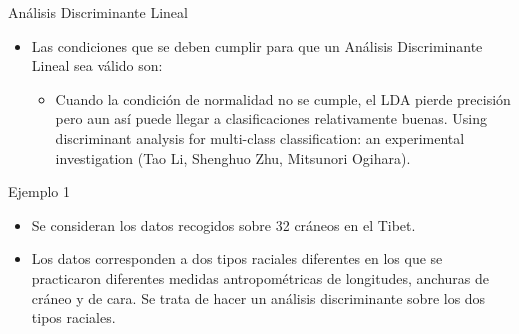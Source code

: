 \documentclass[ignorenonframetext,]{beamer}
\providecommand{\tightlist}{%
  \setlength{\itemsep}{0pt}\setlength{\parskip}{0pt}}
\begin{document}
\begin{frame}{Análisis Discriminante Lineal}

\begin{itemize}
\item
  Las condiciones que se deben cumplir para que un Análisis
  Discriminante Lineal sea válido son:

  \begin{itemize}
  \tightlist
  \item
    Cuando la condición de normalidad no se cumple, el LDA pierde
    precisión pero aun así puede llegar a clasificaciones relativamente
    buenas. Using discriminant analysis for multi-class classification:
    an experimental investigation (Tao Li, Shenghuo Zhu, Mitsunori
    Ogihara).
  \end{itemize}
\end{itemize}

\end{frame}

\begin{frame}{Ejemplo 1}

\begin{itemize}
\item
  Se consideran los datos recogidos sobre 32 cráneos en el Tibet.
\item
  Los datos corresponden a dos tipos raciales diferentes en los que se
  practicaron diferentes medidas antropométricas de longitudes, anchuras
  de cráneo y de cara. Se trata de hacer un análisis discriminante sobre
  los dos tipos raciales.
\end{itemize}

\end{frame}
\end{document}
